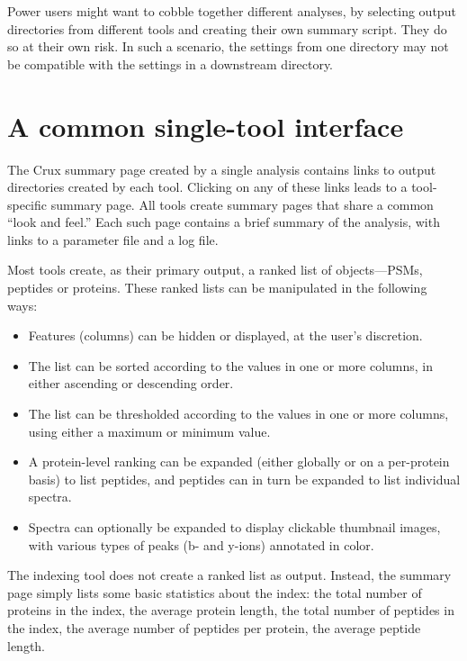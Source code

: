 \documentclass{article}
\begin{document}
Power users might want to cobble together different analyses, by
selecting output directories from different tools and creating their
own summary script.  They do so at their own risk.  In such a
scenario, the settings from one directory may not be compatible with
the settings in a downstream directory.

\section{A common single-tool interface}

The Crux summary page created by a single analysis contains links to
output directories created by each tool.  Clicking on any of these
links leads to a tool-specific summary page.  All tools create summary
pages that share a common ``look and feel.''  Each such page contains
a brief summary of the analysis, with links to a parameter file and a
log file.

Most tools create, as their primary output, a ranked list of
objects---PSMs, peptides or proteins.  These ranked lists can be
manipulated in the following ways:
\begin{itemize}
\item Features (columns) can be hidden or displayed, at the user's
  discretion.
\item The list can be sorted according to the values in one or more
  columns, in either ascending or descending order.
\item The list can be thresholded according to the values in one or
  more columns, using either a maximum or minimum value.
\item A protein-level ranking can be expanded (either globally or on a
  per-protein basis) to list peptides, and peptides can in turn be
  expanded to list individual spectra.
\item Spectra can optionally be expanded to display clickable
  thumbnail images, with various types of peaks (b- and y-ions)
  annotated in color.
\end{itemize}

The indexing tool does not create a ranked list as output.  Instead,
the summary page simply lists some basic statistics about the index:
the total number of proteins in the index, the average protein length,
the total number of peptides in the index, the average number of
peptides per protein, the average peptide length.
\end{document}
